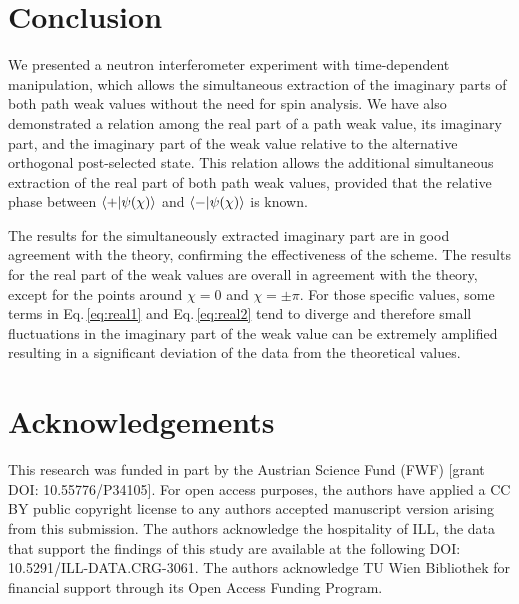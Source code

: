 \documentclass[12pt]{iopart}
\newcommand{\eq}{Eq.}
\begin{document}
\section{Conclusion}\label{sec:Disc}
We presented a neutron interferometer experiment with time-dependent manipulation, which allows the simultaneous extraction of the imaginary parts of both path weak values without the need for spin analysis. We have also demonstrated a relation among the real part of a path weak value, its imaginary part, and the imaginary part of the weak value relative to the alternative orthogonal post-selected state. This relation allows the additional simultaneous extraction of the real part of both path weak values, provided that the relative phase between $\braket{+|\psi(\chi)}$ and $\braket{-|\psi(\chi)}$ is known. 

The results for the simultaneously extracted imaginary part are in good agreement with the theory, confirming the effectiveness of the scheme. The results for the real part of the weak values are overall in agreement with the theory, except for the points around $\chi=0$ and $\chi=\pm\pi$. For those specific values, some terms in \eq\,\eqref{eq:real1} and \eq\,\eqref{eq:real2} tend to diverge and therefore small fluctuations in the imaginary part of the weak value can be extremely amplified resulting in a significant deviation of the data from the theoretical values.
\section{Acknowledgements}
This research was funded in part by the Austrian Science Fund (FWF) [grant DOI: 10.55776/P34105]. For open access purposes, the authors have applied a CC BY public copyright license to any authors accepted manuscript version arising from this submission. The authors acknowledge the hospitality of ILL, the data that support the findings of this study are available at the following DOI: 10.5291/ILL-DATA.CRG-3061. The authors acknowledge TU Wien Bibliothek for financial support through its Open Access Funding Program.
\appendix
\end{document}
